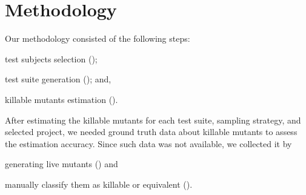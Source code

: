 \documentclass[sigconf,review,anonymous]{acmart}
\begin{document}

\section{Methodology}


Our methodology consisted of the following steps:
\begin{enumerate*}[label=(\arabic*)]
    \item test subjects selection ();
    \item test suite generation ();
    and, \item killable mutants estimation ().
\end{enumerate*}
%
After estimating the killable mutants for each test suite, sampling strategy, and selected project,
we needed ground truth data about killable mutants
to assess the estimation accuracy. %
%
Since such data was not available, %
we collected it by 
\begin{enumerate*}[label=(\arabic*),start=4]   
     \item generating live mutants () and
     \item manually classify them as killable or equivalent ().
\end{enumerate*}
\end{document}
